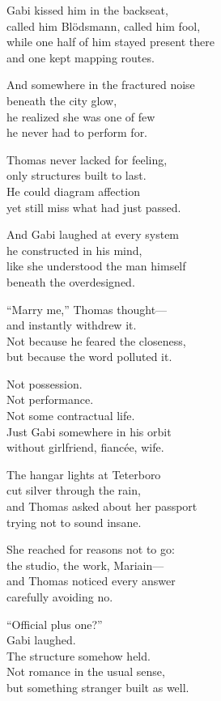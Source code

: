 \begin{lyrics}
Gabi kissed him in the backseat,\\
called him Blödsmann, called him fool,\\
while one half of him stayed present there\\
and one kept mapping routes.

And somewhere in the fractured noise\\
beneath the city glow,\\
he realized she was one of few\\
he never had to perform for.

Thomas never lacked for feeling,\\
only structures built to last.\\
He could diagram affection\\
yet still miss what had just passed.

And Gabi laughed at every system\\
he constructed in his mind,\\
like she understood the man himself\\
beneath the overdesigned.

“Marry me,” Thomas thought—\\
and instantly withdrew it.\\
Not because he feared the closeness,\\
but because the word polluted it.

Not possession.\\
Not performance.\\
Not some contractual life.\\
Just Gabi somewhere in his orbit\\
without girlfriend, fiancée, wife.

The hangar lights at Teterboro\\
cut silver through the rain,\\
and Thomas asked about her passport\\
trying not to sound insane.

She reached for reasons not to go:\\
the studio, the work, Mariain—\\
and Thomas noticed every answer\\
carefully avoiding no.

“Official plus one?”\\
Gabi laughed.\\
The structure somehow held.\\
Not romance in the usual sense,\\
but something stranger built as well.


\end{lyrics}

